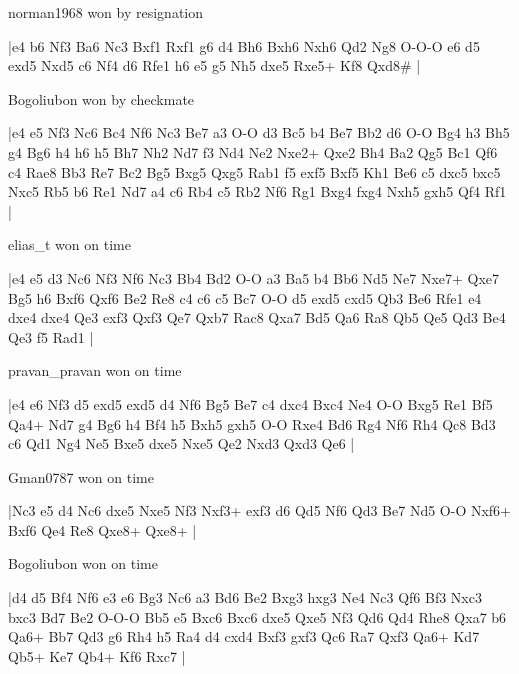 \showboard

norman1968 won by resignation

\makegametitle
|e4 b6 Nf3 Ba6 Nc3 Bxf1 Rxf1 g6 d4 Bh6 Bxh6 Nxh6 Qd2 Ng8 O-O-O e6 d5 exd5 Nxd5 c6 Nf4 d6 Rfe1 h6 e5 g5 Nh5 dxe5 Rxe5+ Kf8 Qxd8\#  |

\showboard

Bogoliubon won by checkmate

\makegametitle
|e4 e5 Nf3 Nc6 Bc4 Nf6 Nc3 Be7 a3 O-O d3 Bc5 b4 Be7 Bb2 d6 O-O Bg4 h3 Bh5 g4 Bg6 h4 h6 h5 Bh7 Nh2 Nd7 f3 Nd4 Ne2 Nxe2+ Qxe2 Bh4 Ba2 Qg5 Bc1 Qf6 c4 Rae8 Bb3 Re7 Bc2 Bg5 Bxg5 Qxg5 Rab1 f5 exf5 Bxf5 Kh1 Be6 c5 dxc5 bxc5 Nxc5 Rb5 b6 Re1 Nd7 a4 c6 Rb4 c5 Rb2 Nf6 Rg1 Bxg4 fxg4 Nxh5 gxh5 Qf4 Rf1  |

\showboard

elias\_t won on time

\makegametitle
|e4 e5 d3 Nc6 Nf3 Nf6 Nc3 Bb4 Bd2 O-O a3 Ba5 b4 Bb6 Nd5 Ne7 Nxe7+ Qxe7 Bg5 h6 Bxf6 Qxf6 Be2 Re8 c4 c6 c5 Bc7 O-O d5 exd5 cxd5 Qb3 Be6 Rfe1 e4 dxe4 dxe4 Qe3 exf3 Qxf3 Qe7 Qxb7 Rac8 Qxa7 Bd5 Qa6 Ra8 Qb5 Qe5 Qd3 Be4 Qe3 f5 Rad1  |

\showboard

pravan\_pravan won on time

\makegametitle
|e4 e6 Nf3 d5 exd5 exd5 d4 Nf6 Bg5 Be7 c4 dxc4 Bxc4 Ne4 O-O Bxg5 Re1 Bf5 Qa4+ Nd7 g4 Bg6 h4 Bf4 h5 Bxh5 gxh5 O-O Rxe4 Bd6 Rg4 Nf6 Rh4 Qc8 Bd3 c6 Qd1 Ng4 Ne5 Bxe5 dxe5 Nxe5 Qe2 Nxd3 Qxd3 Qe6  |

\showboard

Gman0787 won on time

\makegametitle
|Nc3 e5 d4 Nc6 dxe5 Nxe5 Nf3 Nxf3+ exf3 d6 Qd5 Nf6 Qd3 Be7 Nd5 O-O Nxf6+ Bxf6 Qe4 Re8 Qxe8+ Qxe8+  |

\showboard

Bogoliubon won on time

\makegametitle
|d4 d5 Bf4 Nf6 e3 e6 Bg3 Nc6 a3 Bd6 Be2 Bxg3 hxg3 Ne4 Nc3 Qf6 Bf3 Nxc3 bxc3 Bd7 Be2 O-O-O Bb5 e5 Bxc6 Bxc6 dxe5 Qxe5 Nf3 Qd6 Qd4 Rhe8 Qxa7 b6 Qa6+ Bb7 Qd3 g6 Rh4 h5 Ra4 d4 cxd4 Bxf3 gxf3 Qc6 Ra7 Qxf3 Qa6+ Kd7 Qb5+ Ke7 Qb4+ Kf6 Rxc7  |

